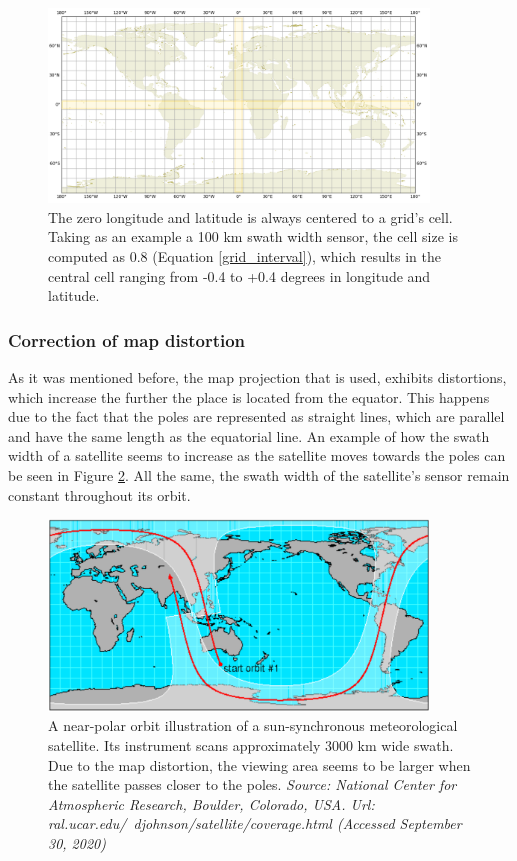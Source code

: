 \begin{figure}
\centering
\includegraphics[width=0.9\textwidth]{Images/map_projection_0covered.png}\caption{The zero longitude and latitude is always centered to a grid's cell. Taking as an example a 100 km swath width sensor, the cell size is computed as 0.8 (Equation \ref{grid_interval}), which results in the central cell ranging from -0.4 to +0.4 degrees in longitude and latitude.}
\label{map_projection_0covered}
\end{figure}

\bigskip
\subsubsection{Correction of map distortion}
\label{Correction of map distortion}
\bigskip

As it was mentioned before, the map projection that is used, exhibits distortions, which increase the further the place is located from the equator. This happens due to the fact that the poles are represented as straight lines, which are parallel and have the same length as the equatorial line. An example of how the swath width of a satellite seems to increase as the satellite moves towards the poles can be seen in Figure \ref{distortion_show-swath-width}. All the same, the swath width of the satellite's sensor remain constant throughout its orbit.

\begin{figure}
\centering
\includegraphics[width=0.9\textwidth]{Images/distortion_show-swath-width.png}\caption{A near-polar orbit illustration of a sun-synchronous meteorological satellite. Its instrument scans approximately 3000 km wide swath. Due to the map distortion, the viewing area seems to be larger when the satellite passes closer to the poles. \textit{Source: National Center for Atmospheric Research, Boulder, Colorado, USA. Url: ral.ucar.edu/~djohnson/satellite/coverage.html (Accessed September 30, 2020)}}
\label{distortion_show-swath-width}
\end{figure}

